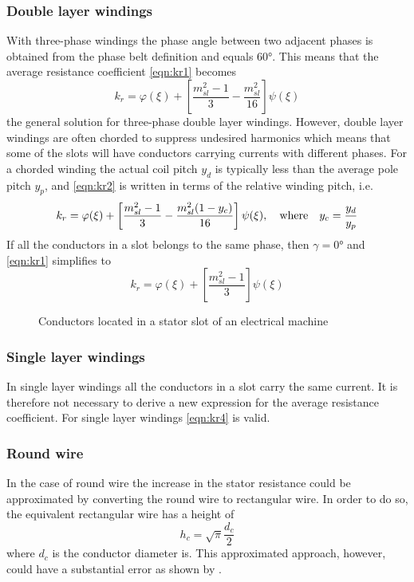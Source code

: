 \subsubsection{Double layer windings}
With three-phase windings the phase angle between two adjacent phases is obtained from the phase belt definition and equals \ang{60}. This means that the average resistance coefficient \eqref{eqn:kr1} becomes 
\begin{equation}
  \label{eqn:kr2}
  k_r = \varphi(\xi)+
  \left[
  \frac{m_{sl}^2-1}{3}-\frac{m_{sl}^2}{16}
  \right]
  \psi(\xi) 
\end{equation}
the general solution for three-phase double layer windings. However, double layer windings are often chorded to suppress undesired harmonics which means that some of the slots will have conductors carrying currents with different phases. For a chorded winding the actual coil pitch $y_d$ is typically less than the average pole pitch $y_p$, and \eqref{eqn:kr2} is written in terms of the relative winding pitch, i.e.
\begin{equation}
  \label{eqn:kr3}
  k_r = \varphi(\xi)+
  \left[
  \frac{m_{sl}^2-1}{3}-\frac{m_{sl}^2(1-y_c)}{16}
  \right]
  \psi(\xi), \quad \textnormal{where} \quad y_c=\frac{y_d}{y_p}
\end{equation}
If all the conductors in a slot belongs to the same phase, then $\gamma=\ang{0}$ and \eqref{eqn:kr1} simplifies to
\begin{equation}
  \label{eqn:kr4}
  k_r = \varphi(\xi)+
  \left[
  \frac{m_{sl}^2-1}{3}
  \right]
  \psi(\xi)
\end{equation}

\begin{figure}[htbp]
  \centering
  
  \vspace{1.5cm}
  
  \caption{Conductors located in a stator slot of an electrical machine}
  \label{fig:Main_eddy_loss}
\end{figure}

\subsubsection{Single layer windings}  
In single layer windings all the conductors in a slot carry the same current. It is therefore not necessary to derive a new expression for the average resistance coefficient. For single layer windings \eqref{eqn:kr4} is valid.

\subsubsection{Round wire}
In the case of round wire the increase in the stator resistance could be approximated by converting the round wire to rectangular wire. In order to do so, the equivalent rectangular wire has a height of
\begin{equation}
  \label{eqn:hc_roundwire}
  h_c = \sqrt{\pi}\frac{d_c}{2}
\end{equation}
where $d_c$ is the conductor diameter is. This approximated approach, however, could have a substantial error as shown by \cite{Nan2005}.


